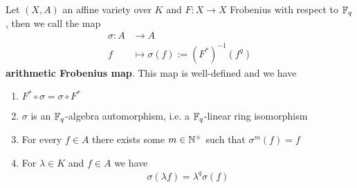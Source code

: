 \documentclass[]{article}
\begin{document}
\begin{definition/theorem}
    Let \((X,A)\) an affine variety over \(K\) and \(F:X \rightarrow X\) Frobenius with respect to \({\mathbb{F}}_q\), then we call the map
    \begin{align*}
        \sigma: A &\rightarrow A \\
        f &\mapsto \sigma(f):=(F^*)^{-1}(f^q)
    \end{align*}
    \textbf{arithmetic Frobenius map}. This map is well-defined and we have
    \begin{enumerate}
        \item \(F^* \circ \sigma = \sigma \circ F^*\)
        \item \(\sigma\) is an \({\mathbb{F}}_q\)-algebra automorphism, i.e. a \({\mathbb{F}}_q\)-linear ring isomorphism
        \item For every \(f \in A\) there exists some \(m \in {\mathbb{N}}^\times\) such that \(\sigma^m(f)=f\)
        \item For \(\lambda \in K\) and \(f \in A\) we have 
        \begin{align*}
            \sigma(\lambda f) = \lambda^q \sigma(f)
        \end{align*}
    \end{enumerate}
    \label{theorem: arithmetic-Frobenius}
\end{definition/theorem}
\end{document}
